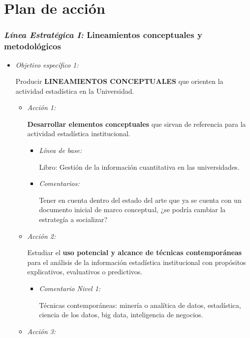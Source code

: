 \documentclass[
]{book}
\begin{document}
\hypertarget{Cap6}{%
\chapter{Plan de acción}\label{Cap6}}

\hypertarget{luxednea-estratuxe9gica-i-lineamientos-conceptuales-y-metodoluxf3gicos}{%
\subsection{\texorpdfstring{\emph{Línea Estratégica I:} Lineamientos conceptuales y metodológicos}{Línea Estratégica I: Lineamientos conceptuales y metodológicos}}\label{luxednea-estratuxe9gica-i-lineamientos-conceptuales-y-metodoluxf3gicos}}

\begin{itemize}
\item
  \emph{Objetivo específico 1:}

  Producir \textbf{LINEAMIENTOS CONCEPTUALES} que orienten
  la actividad estadística en la Universidad.

  \begin{itemize}
  \item
    \emph{Acción 1:}

    \textbf{Desarrollar elementos conceptuales} que sirvan de referencia para la actividad estadística institucional.

    \begin{itemize}
    \item
      \emph{Línea de base:}

      Libro: Gestión de la información cuantitativa en las universidades.
    \item
      \emph{Comentarios:}

      Tener en cuenta dentro del estado del arte que ya se cuenta con un documento inicial de marco conceptual, ¿se podría cambiar la estrategía a socializar?
    \end{itemize}
  \item
    \emph{Acción 2:}

    Estudiar el \textbf{uso potencial y alcance de técnicas contemporáneas} para el análisis de la información estadística institucional con propósitos explicativos, evaluativos o predictivos.

    \begin{itemize}
    \item
      \emph{Comentario Nivel 1:}

      Técnicas contemporáneas: minería o analítica de datos, estadística, ciencia de los datos, big data, inteligencia de negocios.
    \end{itemize}
  \item
    \emph{Acción 3:}


\end{itemize}
\end{itemize}
\end{document}
